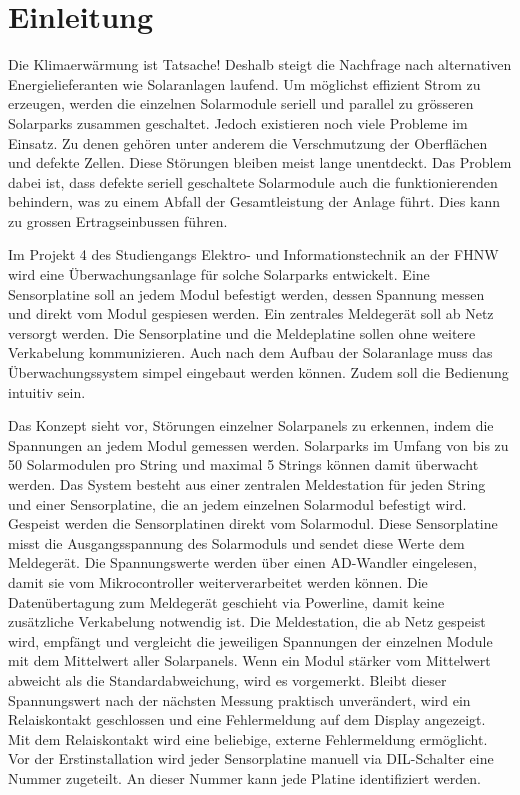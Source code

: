 \section{Einleitung}


Die Klimaerwärmung ist Tatsache! Deshalb steigt die Nachfrage nach alternativen Energielieferanten wie Solaranlagen laufend. Um möglichst effizient Strom zu erzeugen, werden die einzelnen Solarmodule seriell und parallel zu grösseren Solarparks zusammen geschaltet. Jedoch existieren noch viele Probleme im Einsatz. Zu denen gehören unter anderem die Verschmutzung der Oberflächen und defekte Zellen. Diese Störungen bleiben meist lange unentdeckt. Das Problem dabei ist, dass defekte seriell geschaltete Solarmodule auch die funktionierenden behindern, was zu einem Abfall der Gesamtleistung der Anlage führt. Dies kann zu grossen Ertragseinbussen führen.


Im Projekt 4 des Studiengangs Elektro- und Informationstechnik an der FHNW wird eine Überwachungsanlage für solche Solarparks entwickelt. Eine Sensorplatine soll an jedem Modul befestigt werden, dessen Spannung messen und direkt vom Modul gespiesen werden. Ein zentrales Meldegerät soll ab Netz versorgt werden. Die Sensorplatine und die Meldeplatine sollen ohne weitere Verkabelung kommunizieren. Auch nach dem Aufbau der Solaranlage muss das Überwachungssystem simpel eingebaut werden können. Zudem soll die Bedienung intuitiv sein.


Das Konzept sieht vor, Störungen einzelner Solarpanels zu erkennen, indem die Spannungen an jedem Modul gemessen werden. Solarparks im Umfang von bis zu 50 Solarmodulen pro String und maximal 5 Strings können damit überwacht werden. Das System besteht aus einer zentralen Meldestation für jeden String und einer Sensorplatine, die an jedem einzelnen Solarmodul befestigt wird. Gespeist werden die Sensorplatinen direkt vom Solarmodul. Diese Sensorplatine misst die Ausgangsspannung des Solarmoduls und sendet diese Werte dem Meldegerät. Die Spannungswerte werden über einen AD-Wandler eingelesen, damit sie vom Mikrocontroller weiterverarbeitet werden können. Die Datenübertagung zum Meldegerät geschieht via Powerline, damit keine zusätzliche Verkabelung notwendig ist. Die Meldestation, die ab Netz gespeist wird, empfängt und vergleicht die jeweiligen Spannungen der einzelnen Module mit dem Mittelwert aller Solarpanels. Wenn ein Modul stärker vom Mittelwert abweicht als die Standardabweichung, wird es vorgemerkt. Bleibt dieser Spannungswert nach der nächsten Messung praktisch unverändert, wird ein Relaiskontakt geschlossen und eine Fehlermeldung auf dem Display angezeigt. Mit dem Relaiskontakt wird eine beliebige, externe Fehlermeldung ermöglicht. Vor der Erstinstallation wird jeder Sensorplatine manuell via DIL-Schalter eine Nummer zugeteilt. An dieser Nummer kann jede Platine identifiziert werden.

